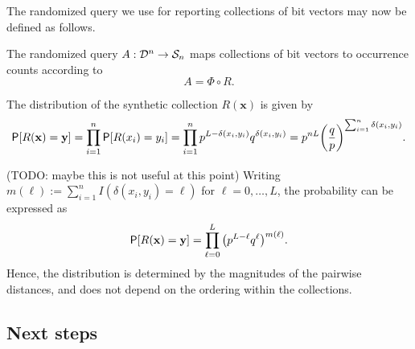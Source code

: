 \documentclass[11pt,draft]{article}
\newcommand{\Dsp}{\mathcal{D}}
\newcommand{\Ssp}{\mathcal{S}}
\newcommand{\xv}{\mathbf{x}}
\newcommand{\yv}{\mathbf{y}}
\begin{document}
The randomized query we use for reporting collections of bit vectors may now
be defined as follows.

\begin{defn}
The randomized query $\map{A}{\Dsp^n}{\Ssp_n}$ maps collections of bit vectors
to occurrence counts according to
\[ A = \Phi \circ R. \]
\end{defn}

The distribution of the synthetic collection $R(\xv)$ is given by
\[
\P[R(\xv) = \yv] = \prod_{i=1}^n \P[R(x_i) = y_i] =
\prod_{i=1}^n p^{L-\delta(x_i,y_i)}q^{\delta(x_i,y_i)} =
p^{nL} \bigg(\frac{q}{p}\bigg)^{\sum_{i=1}^n \delta(x_i, y_i)}.
\]

(TODO: maybe this is not useful at this point)
Writing $m(\ell) := \sum_{i=1}^n I(\delta(x_i, y_i) = \ell)$ for
$\ell = 0,\dots,L$, the probability can be expressed as
\[ \P[R(\xv) = \yv] = \prod_{\ell = 0}^L \big(p^{L-\ell}q^\ell\big)^{m(\ell)}.
\]
Hence, the distribution is determined by the magnitudes of the pairwise
distances, and does not depend on the ordering within the collections.

\subsection{Next steps}
\end{document}
